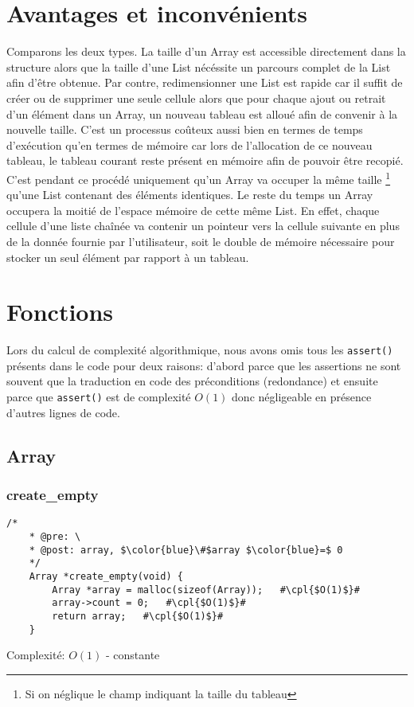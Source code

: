 \documentclass[a4paper, 11pt, oneside]{article}
\begin{document}
\section{Avantages et inconvénients}
	Comparons les deux types. La taille d'un Array est accessible directement dans la structure alors que la taille d'une List nécéssite un parcours complet de la List afin d'être obtenue. Par contre, redimensionner une List est rapide car il suffit de créer ou de supprimer une seule cellule alors que pour chaque ajout ou retrait d'un élément dans un Array, un nouveau tableau est alloué afin de convenir à la nouvelle taille. C'est un processus coûteux aussi bien en termes de temps d'exécution qu'en termes de mémoire car lors de l'allocation de ce nouveau tableau, le tableau courant reste présent en mémoire afin de pouvoir être recopié. C'est pendant ce procédé uniquement qu'un Array va occuper la même taille \footnote{Si on néglique le champ indiquant la taille du tableau} qu'une List contenant des éléments identiques. Le reste du temps un Array occupera la moitié de l'espace mémoire de cette même List. En effet, chaque cellule d'une liste chaînée va contenir un pointeur vers la cellule suivante en plus de la donnée fournie par l'utilisateur, soit le double de mémoire nécessaire pour stocker un seul élément par rapport à un tableau.
	
	\clearpage
\section {Fonctions}
	Lors du calcul de complexité algorithmique, nous avons omis tous les \texttt{assert()} présents dans le code pour deux raisons: d'abord parce que les assertions ne sont souvent que la traduction en code des préconditions (redondance) et ensuite parce que \texttt{assert()} est de complexité $O(1)$ donc négligeable en présence d'autres lignes de code.
	\subsection{Array}
	\subsubsection{create\_empty}
	\begin{lstlisting}[mathescape]
	/*
	* @pre: \
	* @post: array, $\color{blue}\#$array $\color{blue}=$ 0
	*/
	Array *create_empty(void) {
		Array *array = malloc(sizeof(Array));	#\cpl{$O(1)$}#
		array->count = 0;	#\cpl{$O(1)$}#
		return array;	#\cpl{$O(1)$}#
	}
	\end{lstlisting}
	Complexité: $O(1)$ - constante
	
\end{document}
